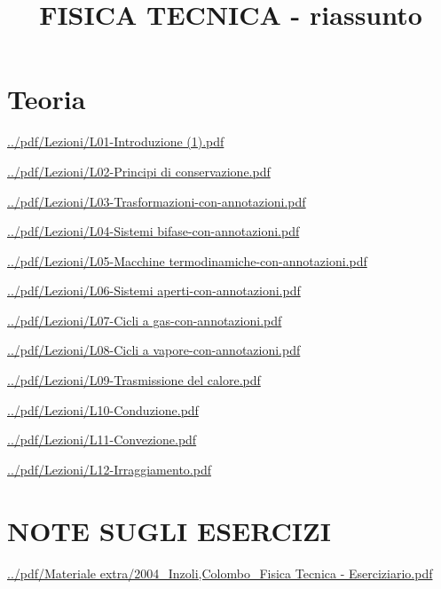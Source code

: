 \documentclass[a4paper, 9pt]{article}
\title{FISICA TECNICA - riassunto}
\begin{document}
    \maketitle
    \tableofcontents{}
    \newpage
    \part{Teoria}
    \newpage
    \url{../pdf/Lezioni/L01-Introduzione (1).pdf}
    
    \newpage
    \url{../pdf/Lezioni/L02-Principi di conservazione.pdf}
    
    \newpage
    \url{../pdf/Lezioni/L03-Trasformazioni-con-annotazioni.pdf}
    
    \newpage
    \url{../pdf/Lezioni/L04-Sistemi bifase-con-annotazioni.pdf}
    
    \newpage
    \url{../pdf/Lezioni/L05-Macchine termodinamiche-con-annotazioni.pdf}
    
    \newpage
    \url{../pdf/Lezioni/L06-Sistemi aperti-con-annotazioni.pdf}
    
    \newpage
    \url{../pdf/Lezioni/L07-Cicli a gas-con-annotazioni.pdf}
    
    \newpage
    \url{../pdf/Lezioni/L08-Cicli a vapore-con-annotazioni.pdf}
    
    \newpage
    \url{../pdf/Lezioni/L09-Trasmissione del calore.pdf}
    
    \newpage
    \url{../pdf/Lezioni/L10-Conduzione.pdf}
    
    \newpage
    \url{../pdf/Lezioni/L11-Convezione.pdf}
    
    \newpage
    \url{../pdf/Lezioni/L12-Irraggiamento.pdf}
    
    \newpage
    \part{NOTE SUGLI ESERCIZI}
    \url{../pdf/Materiale extra/2004_Inzoli,Colombo_Fisica Tecnica - Eserciziario.pdf}
    \newpage
    
\end{document}
